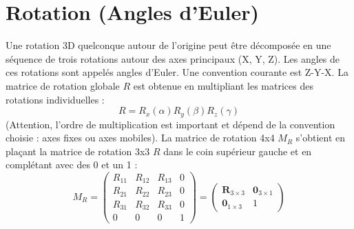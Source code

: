 \section{Rotation (Angles d'Euler)}
Une rotation 3D quelconque autour de l'origine peut être décomposée en une séquence de trois rotations autour des axes principaux (X, Y, Z). Les angles de ces rotations sont appelés angles d'Euler. Une convention courante est Z-Y-X. La matrice de rotation globale \( R \) est obtenue en multipliant les matrices des rotations individuelles :
\[ R = R_x(\alpha) R_y(\beta) R_z(\gamma) \]
(Attention, l'ordre de multiplication est important et dépend de la convention choisie : axes fixes ou axes mobiles).
La matrice de rotation 4x4 \( M_R \) s'obtient en plaçant la matrice de rotation 3x3 \( R \) dans le coin supérieur gauche et en complétant avec des 0 et un 1 :
\[ M_R = \begin{pmatrix}
R_{11} & R_{12} & R_{13} & 0 \\
R_{21} & R_{22} & R_{23} & 0 \\
R_{31} & R_{32} & R_{33} & 0 \\
0 & 0 & 0 & 1
\end{pmatrix}
=
\begin{pmatrix}
\mathbf{R}_{3 \times 3} & \mathbf{0}_{3 \times 1} \\
\mathbf{0}_{1 \times 3} & 1
\end{pmatrix}
\]
